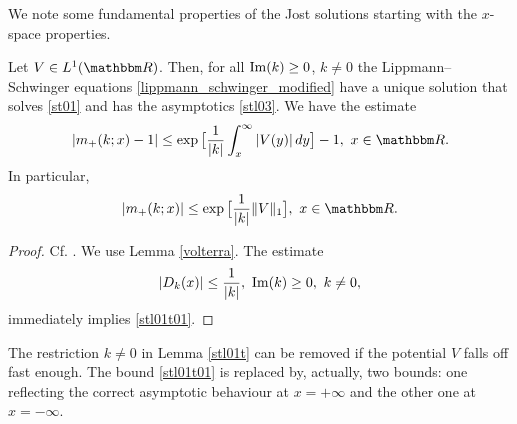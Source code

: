 We note some fundamental properties of the Jost solutions starting with the $x$-space properties.

\begin{lemma}\label{stl01t}
Let $V\in L^1(\R)$. Then, for all $\operatorname{Im}(k)\geq 0$, $k\neq 0$ the Lippmann--Schwinger equations \eqref{lippmann_schwinger_modified} 
have a unique solution that solves \eqref{st01} and has the asymptotics \eqref{stl03}. We have the estimate
\begin{equation}\label{stl01t01}
  |m_+(k;x) - 1 | \leq \exp\big[ \frac{1}{|k|}\int_x^\infty |V(y)|\, dy\big] - 1,\ x\in\R .
\end{equation}
In particular,
\begin{equation}\label{stl01t02}
  |m_+(k;x)| \leq \exp\big[ \frac{1}{|k|} \|V\|_1\big],\ x\in\R .
\end{equation}
\end{lemma}
\begin{proof}
Cf. \cite[2. Lemma 1, (i)]{DeiftTrubowitz1979}.
We use Lemma \ref{volterra}. The estimate
\begin{equation*}
  | D_k(x) | \leq \frac{1}{|k|},\ \im(k)\geq 0,\ k\neq 0,
\end{equation*}
immediately implies \eqref{stl01t01}.
\end{proof}

The restriction $k\neq 0$ in Lemma \ref{stl01t} can be removed if the potential $V$ falls off fast enough.
The bound \eqref{stl01t01} is replaced by, actually, two bounds: one reflecting the correct asymptotic behaviour
at $x=+\infty$ and the other one at $x=-\infty$.

